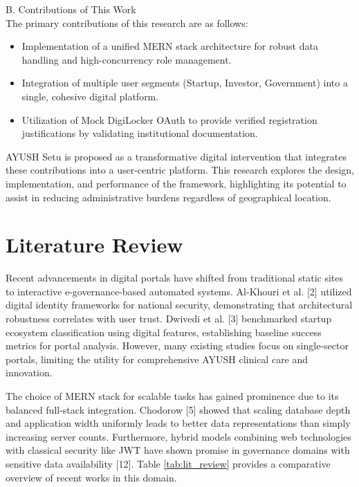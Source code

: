 \documentclass[conference]{IEEEtran}
\begin{document}
B. Contributions of This Work\\
The primary contributions of this research are as follows:
\begin{itemize}
    \item Implementation of a unified MERN stack architecture for robust data handling and high-concurrency role management.
    \item Integration of multiple user segments (Startup, Investor, Government) into a single, cohesive digital platform.
    \item Utilization of Mock DigiLocker OAuth to provide verified registration justifications by validating institutional documentation.
\end{itemize}

AYUSH Setu is proposed as a transformative digital intervention that integrates these contributions into a user-centric platform. This research explores the design, implementation, and performance of the framework, highlighting its potential to assist in reducing administrative burdens regardless of geographical location.

\section{Literature Review}
Recent advancements in digital portals have shifted from traditional static sites to interactive e-governance-based automated systems. Al-Khouri et al. [2] utilized digital identity frameworks for national security, demonstrating that architectural robustness correlates with user trust. Dwivedi et al. [3] benchmarked startup ecosystem classification using digital features, establishing baseline success metrics for portal analysis. However, many existing studies focus on single-sector portals, limiting the utility for comprehensive AYUSH clinical care and innovation.

The choice of MERN stack for scalable tasks has gained prominence due to its balanced full-stack integration. Chodorow [5] showed that scaling database depth and application width uniformly leads to better data representations than simply increasing server counts. Furthermore, hybrid models combining web technologies with classical security like JWT have shown promise in governance domains with sensitive data availability [12]. Table \ref{tab:lit_review} provides a comparative overview of recent works in this domain.
\end{document}
